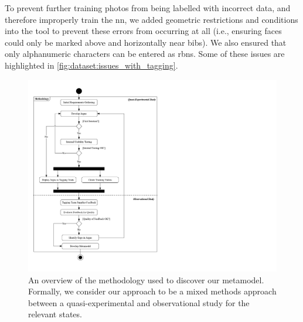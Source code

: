 \noindent
To prevent further training photos from being labelled with incorrect data, and therefore improperly train the \gls{nn},  we added geometric restrictions and conditions into the tool to prevent these errors from occurring at all (i.e., ensuring faces could only be marked above and horizontally near bibs). We also ensured that only alphanumeric characters can be entered as \glspl{rbn}. Some of these issues are highlighted in \cref{fig:dataset:issues_with_tagging}.

\begin{figure}[p]
  \centering
  \includegraphics[width=\textwidth]{images/dataset/methodology}
  \caption[Implementation methodology]{An overview of the methodology used to discover our metamodel. Formally, we consider our approach to be a mixed methods approach between a quasi-experimental and observational study for the relevant states.}
  \label{fig:dataset:methodology}
\end{figure}
